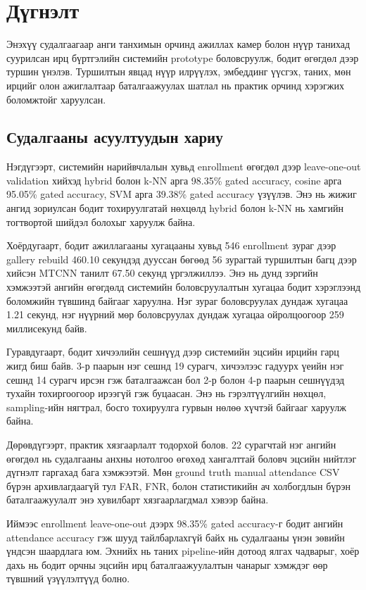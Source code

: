 \chapter{Дүгнэлт}

Энэхүү судалгаагаар анги танхимын орчинд ажиллах камер болон нүүр танихад суурилсан ирц бүртгэлийн системийн prototype боловсруулж, бодит өгөгдөл дээр туршин үнэлэв. Туршилтын явцад нүүр илрүүлэх, эмбеддинг үүсгэх, таних, мөн ирцийг олон ажиглалтаар баталгаажуулах шатлал нь практик орчинд хэрэгжих боломжтойг харуулсан.

\section{Судалгааны асуултуудын хариу}

Нэгдүгээрт, системийн нарийвчлалын хувьд enrollment өгөгдөл дээр leave-one-out validation хийхэд hybrid болон k-NN арга 98.35\% gated accuracy, cosine арга 95.05\% gated accuracy, SVM арга 39.38\% gated accuracy үзүүлэв. Энэ нь жижиг ангид зориулсан бодит тохируулгатай нөхцөлд hybrid болон k-NN нь хамгийн тогтвортой шийдэл болохыг харуулж байна.

Хоёрдугаарт, бодит ажиллагааны хугацааны хувьд 546 enrollment зураг дээр gallery rebuild 460.10 секундэд дууссан бөгөөд 56 зурагтай туршилтын багц дээр хийсэн MTCNN танилт 67.50 секунд үргэлжиллээ. Энэ нь дунд зэргийн хэмжээтэй ангийн өгөгдөлд системийн боловсруулалтын хугацаа бодит хэрэглээнд боломжийн түвшинд байгааг харуулна. Нэг зураг боловсруулах дундаж хугацаа 1.21 секунд, нэг нүүрний мөр боловсруулах дундаж хугацаа ойролцоогоор 259 миллисекунд байв.

Гуравдугаарт, бодит хичээлийн сешнүүд дээр системийн эцсийн ирцийн гарц жигд биш байв. 3-р паарын нэг сешнд 19 сурагч, хичээлээс гадуурх үеийн нэг сешнд 14 сурагч ирсэн гэж баталгаажсан бол 2-р болон 4-р паарын сешнүүдэд тухайн тохиргоогоор ирээгүй гэж буцаасан. Энэ нь гэрэлтүүлгийн нөхцөл, sampling-ийн нягтрал, босго тохируулга гурвын нөлөө хүчтэй байгааг харуулж байна.

Дөрөвдүгээрт, практик хязгаарлалт тодорхой болов. 22 сурагчтай нэг ангийн өгөгдөл нь судалгааны анхны нотолгоо өгөхөд хангалттай боловч эцсийн нийтлэг дүгнэлт гаргахад бага хэмжээтэй. Мөн ground truth manual attendance CSV бүрэн архивлагдаагүй тул FAR, FNR, болон статистикийн ач холбогдлын бүрэн баталгаажуулалт энэ хувилбарт хязгаарлагдмал хэвээр байна.

Иймээс enrollment leave-one-out дээрх 98.35\% gated accuracy-г бодит ангийн attendance accuracy гэж шууд тайлбарлахгүй байх нь судалгааны үнэн зөвийн үндсэн шаардлага юм. Эхнийх нь таних pipeline-ийн дотоод ялгах чадварыг, хоёр дахь нь бодит орчны эцсийн ирц баталгаажуулалтын чанарыг хэмждэг өөр түвшний үзүүлэлтүүд болно.

